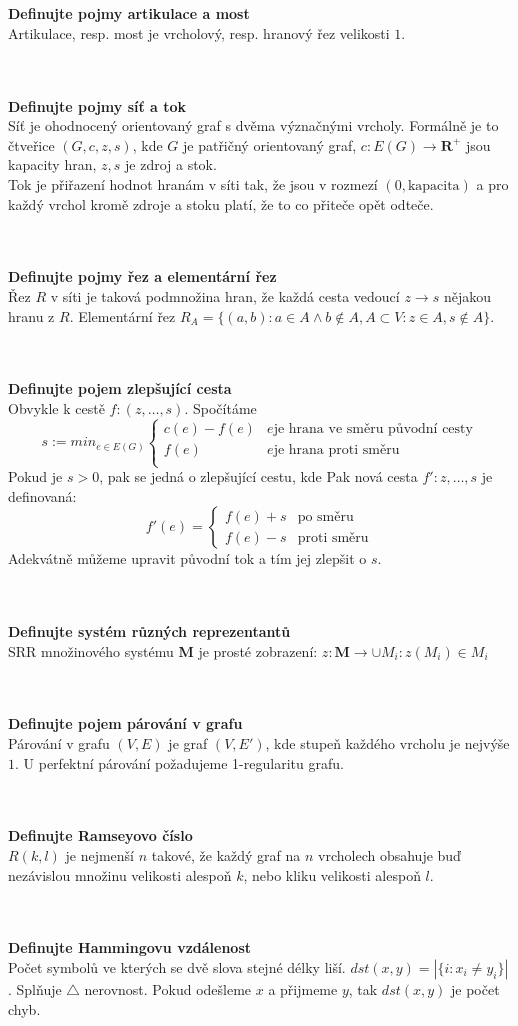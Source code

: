 \documentclass[a4paper]{article}
\newcommand{\hlava}[1]{\text{} \\ \text{} \\ \text{} \hspace{-0.27cm} \textbf{#1} \\}
\newcommand{\str}[1]{\hspace{0.05cm} \fbox{s. #1} }
\begin{document}
\hlava{Definujte pojmy artikulace a most}
Artikulace, resp. most je vrcholový, resp. hranový řez velikosti $1$. \str{17}

\hlava{Definujte pojmy síť a tok}
Síť je ohodnocený orientovaný graf s dvěma význačnými vrcholy. Formálně je to čtveřice $(G, c, z, s)$, kde $G$ je patřičný orientovaný graf, $c: E(G) \rightarrow \mathbf{R}^+$ jsou kapacity hran, $z, s$ je zdroj a stok. \\
Tok je přiřazení hodnot hranám v síti tak, že jsou v rozmezí $(0, \text{kapacita})$ a pro každý vrchol kromě zdroje a stoku platí, že to co přiteče opět odteče. \str{18}

\hlava{Definujte pojmy řez a elementární řez}
Řez $R$ v síti je taková podmnožina hran, že každá cesta vedoucí $z \rightarrow s$ nějakou hranu z $R$. Elementární řez $R_A = \{(a,b): a \in A \wedge b \notin A, A \subset V: z \in A, s \notin A\}$. \str{18}
	
\hlava{Definujte pojem zlepšující cesta}
Obvykle k cestě $f: (z, \dots,  s)$. Spočítáme \[ s := min_{e \in E(G)} \begin{cases} 
	c(e) - f(e) & e \text{je hrana ve směru původní cesty} \\
	f(e) & e \text{je hrana proti směru} \\
\end{cases} \]
Pokud je $s > 0$, pak se jedná o zlepšující cestu, kde
Pak nová cesta $f': z, \dots, s$ je definovaná: \[ f'(e) = \begin{cases}
	f(e) + s & \text{po směru} \\
	f(e) - s & \text{proti směru}
\end{cases} \] 
Adekvátně můžeme upravit původní tok a tím jej zlepšit o $s$. \str{22}

\hlava{Definujte systém různých reprezentantů}
SRR množinového systému \textbf{M} je prosté zobrazení: $z: \textbf{M} \rightarrow \cup M_i: z(M_i) \in M_i$ \str{23}

\hlava{Definujte pojem párování v grafu}
Párování v grafu $(V,E)$ je graf $(V,E')$, kde stupeň každého vrcholu je nejvýše $1$. U perfektní párování požadujeme 1-regularitu grafu.

\hlava{Definujte Ramseyovo číslo}
$R(k,l)$ je nejmenší $n$ takové, že každý graf na $n$ vrcholech obsahuje buď nezávislou množinu velikosti alespoň $k$, nebo kliku velikosti alespoň $l$. \str{26}

\hlava{Definujte Hammingovu vzdálenost}
Počet symbolů ve kterých se dvě slova stejné délky liší. $dst(x,y) = |\{i: x_i \ne y_i \}|$. Splňuje $\triangle$ nerovnost. Pokud odešleme $x$ a přijmeme $y$, tak $dst(x,y)$ je počet chyb. \str{29}
\end{document}
